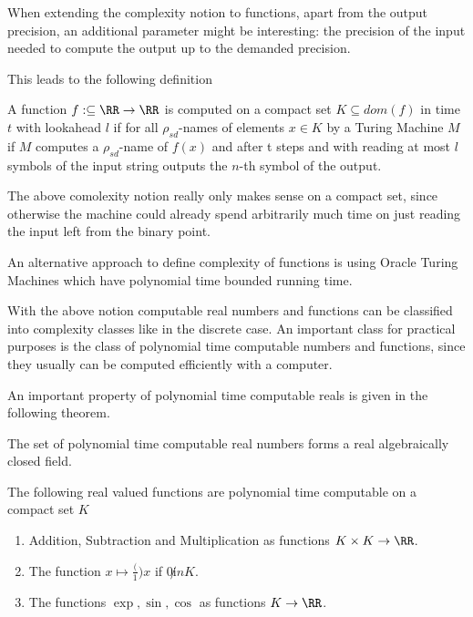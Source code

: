 		When extending the complexity notion to functions, apart from the output
    precision, an additional parameter might be interesting: the precision of the input
		needed to compute the output up to the demanded precision.

    This leads to the following definition
		\begin{definition}
      A function $f: \subseteq \RR \to \RR$ is computed on a compact set $K
      \subseteq dom(f)$ in time $t$ with lookahead $l$ if for all
      $\rho_{sd}$-names of elements $ x \in K$ by a Turing Machine $M$ if $M$
      computes a $\rho_{sd}$-name of $f(x)$ and after t steps and with reading
      at most $l$ symbols of the input string outputs the $n$-th symbol of the
      output.   
    \end{definition} 
    The above comolexity notion really only makes sense on a compact set, since
    otherwise the machine could already spend arbitrarily much time on just
    reading the input left from the binary point.
    
    An alternative approach to define complexity of functions is using Oracle
    Turing Machines which have polynomial time bounded running time. 

    With the above notion computable real numbers and functions can be
    classified into complexity classes like in the discrete case.
    An important class for practical purposes is the class of polynomial time
    computable numbers and functions, since they usually can be computed
    efficiently with a computer.
   
    An important property of polynomial time computable reals is given in the
    following theorem.
		\begin{theorem}
			The set of polynomial time computable real numbers forms a real algebraically closed field.
		\end{theorem}
		\begin{example}
     The following real valued functions are polynomial time computable on a compact set
     $K$
     \begin{enumerate}
       \item Addition, Subtraction and Multiplication as functions $K \times K
         \to \RR$.
        \item The function $x \mapsto \frac(1){x}$ if $0 \not in K$. 
         \item The functions $\exp, \sin, \cos$ as functions $K \to \RR$.
     \end{enumerate}
		\end{example}
